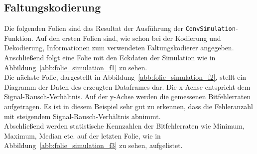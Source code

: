 \subsection{Faltungskodierung}
\label{kapitel:visualisierung_simulation_faltungskodierung}
Die folgenden Folien sind das Resultat der Ausführung der \texttt{ConvSimulation}-Funktion. Auf den ersten Folien sind, wie schon bei der Kodierung und Dekodierung, Informationen zum verwendeten Faltungskodierer angegeben.
\\
Anschließend folgt eine Folie mit den Eckdaten der Simulation wie in Abbildung~\ref{abb:folie_simulation_f1} zu sehen.
\\
Die nächste Folie, dargestellt in Abbildung~\ref{abb:folie_simulation_f2}, stellt ein Diagramm der Daten des erzeugten Dataframes dar. Die x-Achse entspricht dem Signal-Rausch-Verhältnis. Auf der y-Achse werden die gemessenen Bitfehlerraten aufgetragen. Es ist in diesem Beispiel sehr gut zu erkennen, dass die Fehleranzahl mit steigendem Signal-Rausch-Verhältnis abnimmt.
\\
Abschließend werden statistische Kennzahlen der Bitfehlerraten wie Minimum, Maximum, Median etc. auf der letzten Folie, wie in Abbildung~\ref{abb:folie_simulation_f3} zu sehen, aufgelistet. 

